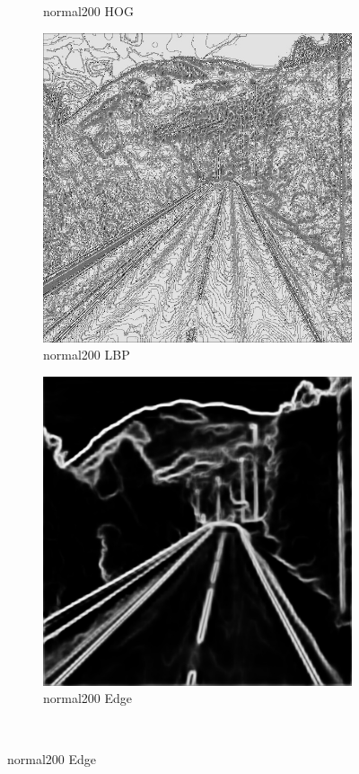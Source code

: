 \documentclass[a4paper, 10pt]{article}
\begin{document}
\begin{figure}[htbp]
\begin{subfigure}{0.24\textwidth}
			\caption*{normal200 HOG}
			\label{fig: normal200 HOG}
		\end{subfigure}	
		\begin{subfigure}{0.24\textwidth}
			\includegraphics[width=\linewidth]{picture/alldata_lbp/normal200}
			\caption*{normal200 LBP}
			\label{fig: normal200 LBP}
		\end{subfigure}
		\begin{subfigure}{0.24\textwidth}
			\includegraphics[width=\linewidth]{picture/alldata_edge/normal200}
			\caption*{normal200 Edge}
			\label{fig: normal200 Edge}
		\end{subfigure} \\
		

\end{figure}
\end{document}
